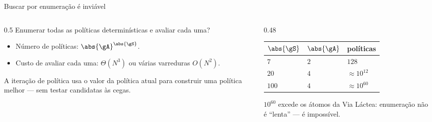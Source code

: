 \documentclass[aspectratio=169, 11pt]{beamer}
\begin{document}
\begin{frame}{Buscar por enumeração é inviável}
  \begin{columns}[T]
    \begin{column}{0.5\textwidth}
      Enumerar todas as políticas determinísticas e avaliar cada uma?
      \begin{itemize}\setlength{\itemsep}{0.3ex}
        \item Número de políticas: $\abs{\gA}^{\abs{\gS}}$.
        \item Custo de avaliar cada uma: $\Theta(N^3)$ ou várias varreduras $O(N^2)$.
      \end{itemize}
      \vspace{0.4em}
      A \alert{iteração de política} usa o valor da política atual para construir uma
      política melhor --- sem testar candidatas às cegas.
    \end{column}
    \begin{column}{0.48\textwidth}
      \begin{center}\small
      \begin{tabular}{@{}lll@{}}
        \toprule
        $\abs{\gS}$ & $\abs{\gA}$ & políticas \\
        \midrule
        $7$   & $2$ & $128$ \\
        $20$  & $4$ & $\approx 10^{12}$ \\
        $100$ & $4$ & $\approx 10^{60}$ \\
        \bottomrule
      \end{tabular}
      \end{center}
      \vspace{0.5em}
      \begin{alertabox}
        $10^{60}$ excede os átomos da Via Láctea: enumeração não é ``lenta'' — é
        impossível.
      \end{alertabox}
    \end{column}
  \end{columns}
\end{frame}
\end{document}
